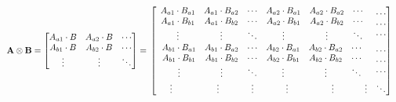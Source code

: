 \documentclass[12pt]{report}
\begin{document}
	\begin{align*}
	\textbf{A}\otimes \textbf{B} &=
	\begin{bmatrix} A_{a1}\cdot B & A_{a2}\cdot B & \cdots \\ A_{b1}\cdot B & A_{b2}\cdot B & \cdots \\ \vdots & \vdots & \ddots \end{bmatrix} = \text{\hspace{0cm}}
	\begin{bmatrix}
	\begin{matrix} A_{a1}\cdot B_{a1} & A_{a1}\cdot B_{a2} & \cdots \\ A_{a1}\cdot B_{b1} & A_{a1}\cdot B_{b2} & \cdots \\ \vdots & \vdots & \ddots \end{matrix} \quad \begin{matrix} A_{a2}\cdot B_{a1} & A_{a2}\cdot B_{a2} & \cdots \\ A_{a2}\cdot B_{b1} & A_{a2}\cdot B_{b2} & \cdots \\ \vdots & \vdots & \ddots \end{matrix} & \begin{matrix} \cdots \\ \cdots \\ \cdots \end{matrix} \\
	\begin{matrix} A_{b1}\cdot B_{a1} & A_{b1}\cdot B_{a2} & \cdots \\ A_{b1}\cdot B_{b1} & A_{b1}\cdot B_{b2} & \cdots \\ \vdots & \vdots & \ddots \end{matrix} \quad \begin{matrix} A_{b2}\cdot B_{a1} & A_{b2}\cdot B_{a2} & \cdots \\ A_{b2}\cdot B_{b1} & A_{b2}\cdot B_{b2} & \cdots \\ \vdots & \vdots & \ddots \end{matrix} & \begin{matrix} \cdots \\ \cdots \\ \cdots \end{matrix} \\
	\begin{matrix} \text{\hspace{0.55cm}} \vdots \text{\hspace{1.45cm}} & \vdots  \text{\hspace{0.95cm}} & \vdots \text{\hspace{0.85cm}} \end{matrix} \text{\hspace{0.45cm}} \begin{matrix} \vdots \text{\hspace{1.4cm}} & \vdots \text{\hspace{0.9cm}} & \vdots \end{matrix} & \begin{matrix} \ddots \end{matrix}

\end{bmatrix}
\end{align*}
\end{document}
